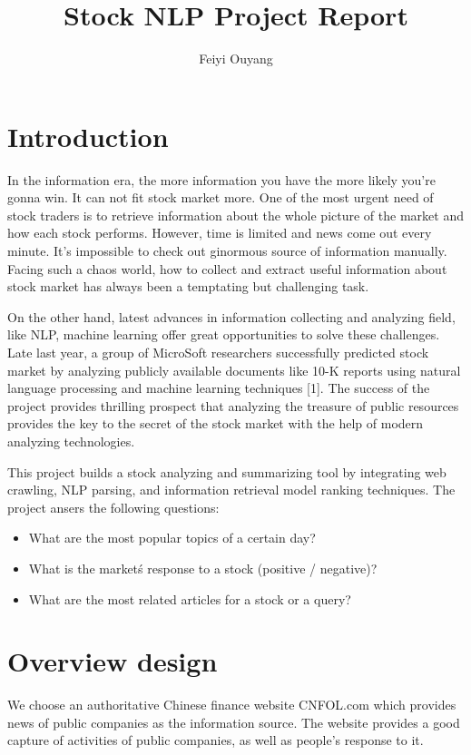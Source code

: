 \documentclass{article}
\begin{document}
\title{Stock NLP Project Report}
\author{Feiyi Ouyang}
\date{}
\maketitle
\section{Introduction}
In the information era, the more information you have the more likely you're gonna win. It can not fit stock market more. One of the most urgent need of stock traders is to retrieve information about the whole picture of the market and how each stock performs. However, time is limited and news come out every minute. It's impossible to check out ginormous source of information manually. Facing such a chaos world, how to collect and extract useful information about stock market has always been a temptating but challenging task. 

On the other hand, latest advances in information collecting and analyzing field, like NLP, machine learning offer great opportunities to solve these challenges. Late last year, a group of MicroSoft researchers successfully predicted stock market by analyzing publicly available documents like 10-K reports using natural language processing and machine learning techniques [1]. The success of the project provides thrilling prospect that analyzing the treasure of public resources provides the key to the secret of the stock market with the help of modern analyzing technologies. 

This project builds a stock analyzing and summarizing tool by integrating web crawling, NLP parsing, and information retrieval model ranking techniques. The project ansers the following questions: 

\begin{itemize}
  \item What are the most popular topics of a certain day?
  \item What is the market\'s response to a stock (positive / negative)?
  \item What are the most related articles for a stock or a query?
\end{itemize}

\section{Overview design}
We choose an authoritative Chinese finance website CNFOL.com which provides news of public companies as the information source. The website provides a good capture of activities of public companies, as well as people's response to it.
\end{document}
